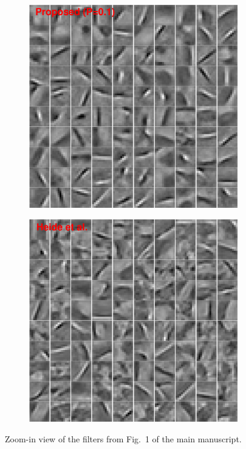 \documentclass[10pt,twocolumn,letterpaper]{article}
\begin{document}
\begin{figure}[h]
\centering
\begin{subfigure}{0.49\textwidth}
  \includegraphics[width=1\linewidth]{figure/batchFruit100.pdf}
\end{subfigure}
\begin{subfigure}{0.49\textwidth}
  \includegraphics[width=1\linewidth]{figure/heideFruit100.pdf}
  \end{subfigure}
\caption{Zoom-in view of the filters from Fig.~1 of the main manuscript.}
\end{figure}
\end{document}
